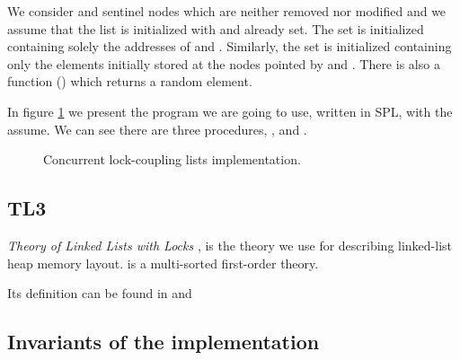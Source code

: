 We consider \head and \tail sentinel nodes which are neither removed nor 
modified and we assume that the list is initialized with \head and \tail 
already set.
%
The set \region is initialized containing solely the addresses of \head 
and \tail.
%
Similarly, the set \elements is initialized containing only the elements 
initially stored at the nodes pointed by \head and \tail.
%
There is also a function () which returns a random element. 

In figure \ref{fig:listcode} we present the program we are going to use, written in \gls{SPL}, with the assume. We can see there are three procedures, \Search, \Insert and \Remove. 

\begin{figure}[!htbp]
		\caption{ Concurrent lock-coupling lists implementation.}
		\label{fig:listcode}
\end{figure}

\subsection{TL3}

\emph{Theory of Linked Lists with Locks} \TLLpL, is the theory we use for describing linked-list heap memory layout. \TLLpL is a multi-sorted first-order theory.

Its definition can be found in  and \citep[6.2]{thesisAle}


\subsection{Invariants of the implementation}


